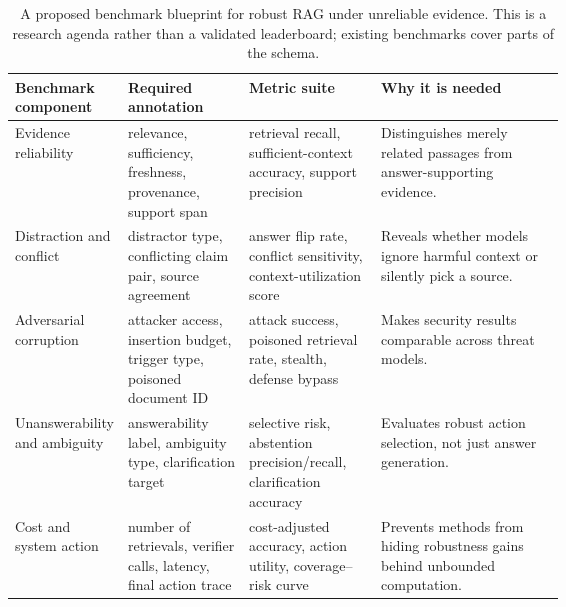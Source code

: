 \begin{table}[t]
\centering
\scriptsize
\begin{tabularx}{\linewidth}{p{0.18\linewidth}p{0.22\linewidth}p{0.24\linewidth}X}
\toprule
\textbf{Benchmark component} & \textbf{Required annotation} & \textbf{Metric suite} & \textbf{Why it is needed} \\
\midrule
Evidence reliability & relevance, sufficiency, freshness, provenance, support span & retrieval recall, sufficient-context accuracy, support precision & Distinguishes merely related passages from answer-supporting evidence. \\
Distraction and conflict & distractor type, conflicting claim pair, source agreement & answer flip rate, conflict sensitivity, context-utilization score & Reveals whether models ignore harmful context or silently pick a source. \\
Adversarial corruption & attacker access, insertion budget, trigger type, poisoned document ID & attack success, poisoned retrieval rate, stealth, defense bypass & Makes security results comparable across threat models. \\
Unanswerability and ambiguity & answerability label, ambiguity type, clarification target & selective risk, abstention precision/recall, clarification accuracy & Evaluates robust action selection, not just answer generation. \\
Cost and system action & number of retrievals, verifier calls, latency, final action trace & cost-adjusted accuracy, action utility, coverage--risk curve & Prevents methods from hiding robustness gains behind unbounded computation. \\
\bottomrule
\end{tabularx}
\caption{A proposed benchmark blueprint for robust RAG under unreliable evidence. This is a research agenda rather than a validated leaderboard; existing benchmarks cover parts of the schema.}
\label{tab:benchmark-blueprint}
\end{table}
